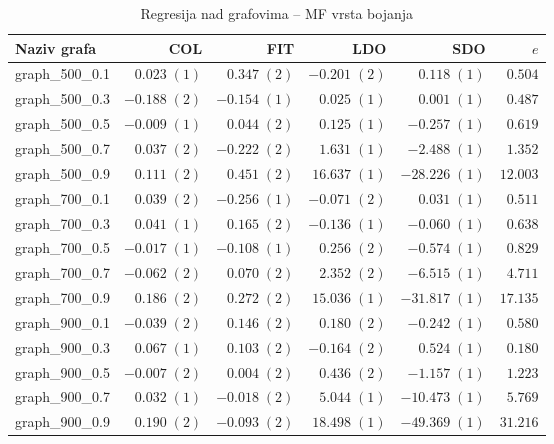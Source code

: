 \documentclass[times, utf8, diplomski, numeric]{fer}
\begin{document}
\begin{table}[htb]
	\caption{Regresija nad grafovima -- MF vrsta bojanja}
	\label{tbl:regresija-MF}
	\centering
	\begin{tabular}{|l|r|r|r|r|r|} \hline
	Naziv grafa & COL & FIT & LDO & SDO & $e$ \\ \hline \hline
graph\_500\_0.1 & $ 0.023\; (1) $ & $ 0.347\; (2) $ & $ -0.201\; (2) $ & $ 0.118\; (1) $ & $ 0.504 $\\ \hline
graph\_500\_0.3 & $ -0.188\; (2) $ & $ -0.154\; (1) $ & $ 0.025\; (1) $ & $ 0.001\; (1) $ & $ 0.487 $\\ \hline
graph\_500\_0.5 & $ -0.009\; (1) $ & $ 0.044\; (2) $ & $ 0.125\; (1) $ & $ -0.257\; (1) $ & $ 0.619 $\\ \hline
graph\_500\_0.7 & $ 0.037\; (2) $ & $ -0.222\; (2) $ & $ 1.631\; (1) $ & $ -2.488\; (1) $ & $ 1.352 $\\ \hline
graph\_500\_0.9 & $ 0.111\; (2) $ & $ 0.451\; (2) $ & $ 16.637\; (1) $ & $ -28.226\; (1) $ & $ 12.003 $\\ \hline
graph\_700\_0.1 & $ 0.039\; (2) $ & $ -0.256\; (1) $ & $ -0.071\; (2) $ & $ 0.031\; (1) $ & $ 0.511 $\\ \hline
graph\_700\_0.3 & $ 0.041\; (1) $ & $ 0.165\; (2) $ & $ -0.136\; (1) $ & $ -0.060\; (1) $ & $ 0.638 $\\ \hline
graph\_700\_0.5 & $ -0.017\; (1) $ & $ -0.108\; (1) $ & $ 0.256\; (2) $ & $ -0.574\; (1) $ & $ 0.829 $\\ \hline
graph\_700\_0.7 & $ -0.062\; (2) $ & $ 0.070\; (2) $ & $ 2.352\; (2) $ & $ -6.515\; (1) $ & $ 4.711 $\\ \hline
graph\_700\_0.9 & $ 0.186\; (2) $ & $ 0.272\; (2) $ & $ 15.036\; (1) $ & $ -31.817\; (1) $ & $ 17.135 $\\ \hline
graph\_900\_0.1 & $ -0.039\; (2) $ & $ 0.146\; (2) $ & $ 0.180\; (2) $ & $ -0.242\; (1) $ & $ 0.580 $\\ \hline
graph\_900\_0.3 & $ 0.067\; (1) $ & $ 0.103\; (2) $ & $ -0.164\; (2) $ & $ 0.524\; (1) $ & $ 0.180 $\\ \hline
graph\_900\_0.5 & $ -0.007\; (2) $ & $ 0.004\; (2) $ & $ 0.436\; (2) $ & $ -1.157\; (1) $ & $ 1.223 $\\ \hline
graph\_900\_0.7 & $ 0.032\; (1) $ & $ -0.018\; (2) $ & $ 5.044\; (1) $ & $ -10.473\; (1) $ & $ 5.769 $\\ \hline
graph\_900\_0.9 & $ 0.190\; (2) $ & $ -0.093\; (2) $ & $ 18.498\; (1) $ & $ -49.369\; (1) $ & $ 31.216 $\\ \hline
	\end{tabular}
\end{table} 
\end{document}
